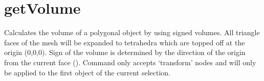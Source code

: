 \documentclass[letterpaper,10pt,english]{sphinxmanual}
\begin{document}
\section{getVolume}
\label{\detokenize{pk_src.getVolume:getvolume}}\label{\detokenize{pk_src.getVolume::doc}}\label{\detokenize{pk_src.getVolume:id1}}
{\hyperref[\detokenize{index:commands}]{}}
\label{\detokenize{pk_src.getVolume:module-pk_src.getVolume}}
Calculates the volume of a polygonal object by using signed volumes.
All triangle faces of the mesh will be expanded to tetrahedra which are topped off at the origin (0,0,0). Sign of the volume is determined by the direction of the origin from the current face
().
Command only accepts ‘transform’ nodes and will only be applied to the first object of the current selection.
\end{document}
